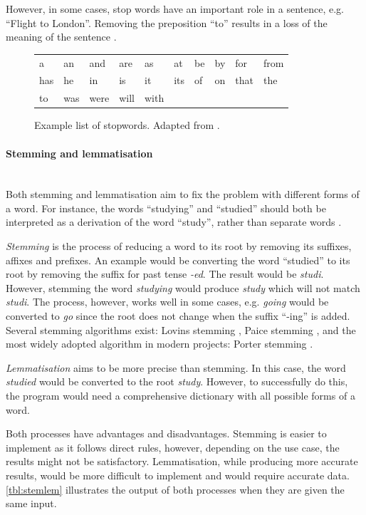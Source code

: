 \documentclass[12pt,a4paper]{article}
\newcommand{\myparagraph}[1]{\paragraph{#1}\mbox{}\\}
\newcommand{\captionstyle}[1] {
    \small{#1}
}
\begin{document}
However, in some cases, stop words have an important role in a sentence, e.g. “Flight to London”. Removing the preposition “to” results in a loss of the meaning of the sentence \citep{Manning2008}. 

\begin{figure}[!htb]
	\begin{center}
	\begin{tabular}{@{}llllllllll@{}}
		\toprule
		a & an & and & are & as & at & be & by & for & from \\ 
		has & he & in & is & it & its & of & on & that & the \\
		to & was & were & will & with & & & & & \\ \bottomrule
	\end{tabular}
	\end{center}
	\caption{\captionstyle{Example list of stopwords. Adapted from \citep{Manning2008}.}}	
	\label{tbl:stopwords}
\end{figure}

\myparagraph{Stemming and lemmatisation}
Both stemming and lemmatisation aim to fix the problem with different forms of a word. For instance, the words “studying” and “studied” should both be interpreted as a derivation of the word “study”, rather than separate words \citep{Manning2008}.

\textit{Stemming} is the process of reducing a word to its root \citep{Martinez2010} by removing its suffixes, affixes and prefixes. An example would be converting the word “studied” to its root by removing the suffix for past tense \textit{-ed}. The result would be \textit{studi}. However, stemming the word \textit{studying} would produce \textit{study} which will not match \textit{studi}. The process, however, works well in some cases, e.g. \textit{going} would be converted to \textit{go} since the root does not change when the suffix “-ing” is added. Several stemming algorithms exist: Lovins stemming \citep{Lovins1968}, Paice stemming \citep{Paice1990}, and the most widely adopted algorithm in modern projects: Porter stemming \citep{Porter1997}.

\textit{Lemmatisation} aims to be more precise than stemming. In this case, the word \textit{studied} would be converted to the root \textit{study}. However, to successfully do this, the program would need a comprehensive dictionary with all possible forms of a word.

Both processes have advantages and disadvantages. Stemming is easier to implement as it follows direct rules, however, depending on the use case, the results might not be satisfactory. Lemmatisation, while producing more accurate results, would be more difficult to implement and would require accurate data. \cref{tbl:stemlem} illustrates the output of both processes when they are given the same input. 
\end{document}
